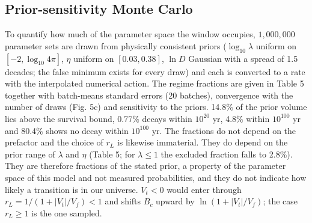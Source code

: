 \documentclass[11pt,a4paper]{article}
\begin{document}
\subsection{Prior-sensitivity Monte Carlo}
To quantify how much of the parameter space the window occupies, $1,000,000$ parameter sets are drawn from physically consistent priors ($\log_{10}\lambda$ uniform on $[-2,\log_{10}4\pi]$, $\eta$ uniform on $[0.03,0.38]$, $\ln D$ Gaussian with a spread of 1.5 decades; the false minimum exists for every draw) and each is converted to a rate with the interpolated numerical action. The regime fractions are given in Table 5 together with batch-means standard errors (20 batches), convergence with the number of draws (Fig. 5c) and sensitivity to the priors. 14.8\% of the prior volume lies above the survival bound, 0.77\% decays within $10^{20}$ yr, 4.8\% within $10^{100}$ yr and 80.4\% shows no decay within $10^{100}$ yr. The fractions do not depend on the prefactor and the choice of $r_L$ is likewise immaterial. They do depend on the prior range of $\lambda$ and $\eta$ (Table 5; for $\lambda\le1$ the excluded fraction falls to 2.8\%). They are therefore fractions of the stated prior, a property of the parameter space of this model and not measured probabilities, and they do not indicate how likely a transition is in our universe. $V_t<0$ would enter through $r_L=1/(1+|V_t|/V_f)<1$ and shifts $B_c$ upward by $\ln(1+|V_t|/V_f)$; the case $r_L\ge1$ is the one sampled.
\end{document}
